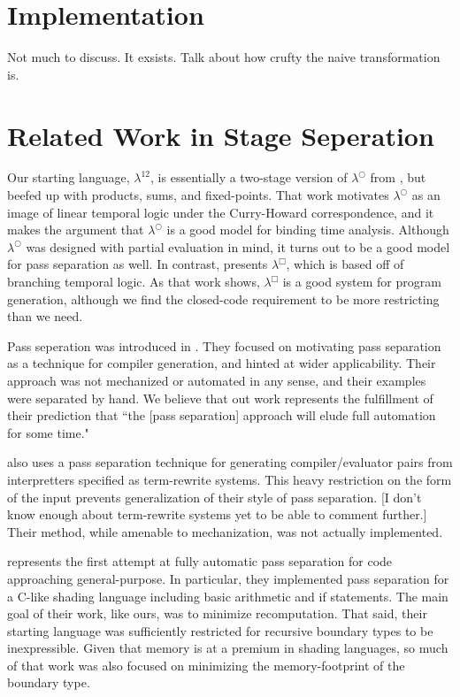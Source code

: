 \documentclass{article}
\begin{document}
\section {Implementation}

Not much to discuss.  It exsists.  Talk about how crufty the naive transformation is.

\section{Related Work in Stage Seperation}

Our starting language, $\lambda^{12}$, is essentially a two-stage version of $\lambda^\bigcirc$ from \cite{davies96}, but beefed up with products, sums, and fixed-points.  That work motivates $\lambda^\bigcirc$ as an image of linear temporal logic under the Curry-Howard correspondence, and it makes the argument that $\lambda^\bigcirc$ is a good model for binding time analysis.  Although $\lambda^\bigcirc$ was designed with partial evaluation in mind, it turns out to be a good model for pass separation as well.  In contrast, \cite{davies01} presents $\lambda^\Box$, which is based off of branching temporal logic.  As that work shows, $\lambda^\Box$ is a good system for program generation, although we find the closed-code requirement to be more restricting than we need.

Pass seperation was introduced in \cite{jorring}.  They focused on motivating pass separation as a technique for compiler generation, and hinted at wider applicability.  Their approach was not mechanized or automated in any sense, and their examples were separated by hand.  We believe that out work represents the fulfillment of their prediction that ``the [pass separation] approach will elude full automation for some time."

\cite{hannan94} also uses a pass separation technique for generating compiler/evaluator pairs from interpretters specified as term-rewrite systems.  This heavy restriction on the form of the input prevents generalization of their style of pass separation.  [I don't know enough about term-rewrite systems yet to be able to comment further.]  Their method, while amenable to mechanization, was not actually implemented.

\cite{knoblock} represents the first attempt at fully automatic pass separation for code approaching general-purpose.  In particular, they implemented pass separation for a C-like shading language including basic arithmetic and if statements.  The main goal of their work, like ours, was to minimize recomputation. That said, their starting language was sufficiently restricted for recursive boundary types to be inexpressible.  Given that memory is at a premium in shading languages, so much of that work was also focused on minimizing the memory-footprint of the boundary type.



\end{document}
